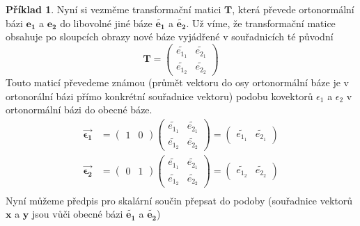 \documentclass[a5paper,12pt]{amsbook}
\theoremstyle{definition}
\newtheorem{example}{Příklad}[chapter]
\newcommand{\myvec}[1]{\mathbf{#1}}
\newcommand{\mycoord}[1]{\overrightarrow{\mathbf{#1}}}
\newcommand{\mymatrix}[1]{\mathbf{#1}}
\begin{document}
\begin{example}
Nyní si vezměme transformační matici $\mymatrix{T}$, která převede ortonormální bázi
$\myvec{e_1}$ a $\myvec{e_2}$ do libovolné jiné báze $\myvec{\widetilde{e_1}}$
a $\myvec{\widetilde{e_2}}$. Už víme, že transformační matice obsahuje po sloupcích obrazy nové
báze vyjádřené v souřadnicích té původní
\begin{equation*}
\mymatrix{T} = \left(\begin{array}{cc}
\widetilde{e_{1_1}} & \widetilde{e_{2_1}} \\
\widetilde{e_{1_2}} & \widetilde{e_{2_2}}
\end{array}\right)
\end{equation*}
Touto maticí převedeme známou (průmět vektoru do osy ortonormální báze je v ortonorální
bázi přímo konkrétní souřadnice vektoru) podobu kovektorů $\epsilon_1$ a $\epsilon_2$
v ortonormální bázi do obecné báze.
\begin{equation*}
\begin{split}
\mycoord{\epsilon_1} &= 
\left(\begin{array}{cc}1 & 0\end{array}\right)
\left(\begin{array}{cc}
\widetilde{e_{1_1}} & \widetilde{e_{2_1}} \\
\widetilde{e_{1_2}} & \widetilde{e_{2_2}}
\end{array}\right) =
\left(\begin{array}{cc}\widetilde{e_{1_1}} & \widetilde{e_{2_1}}\end{array}\right) \\
\mycoord{\epsilon_2} &= 
\left(\begin{array}{cc}0 & 1\end{array}\right)
\left(\begin{array}{cc}
\widetilde{e_{1_1}} & \widetilde{e_{2_1}} \\
\widetilde{e_{1_2}} & \widetilde{e_{2_2}}
\end{array}\right) =
\left(\begin{array}{cc}\widetilde{e_{1_2}} & \widetilde{e_{2_2}}\end{array}\right) \\
\end{split}
\end{equation*}
Nyní můžeme předpis pro skalární součin přepsat do podoby (souřadnice vektorů $\myvec{x}$
a $\myvec{y}$ jsou vůči obecné bázi $\myvec{\widetilde{e_1}}$ a $\myvec{\widetilde{e_2}}$)
\begin{equation*}
\begin{split}

\end{split}
\end{equation*}
\end{example}
\end{document}
